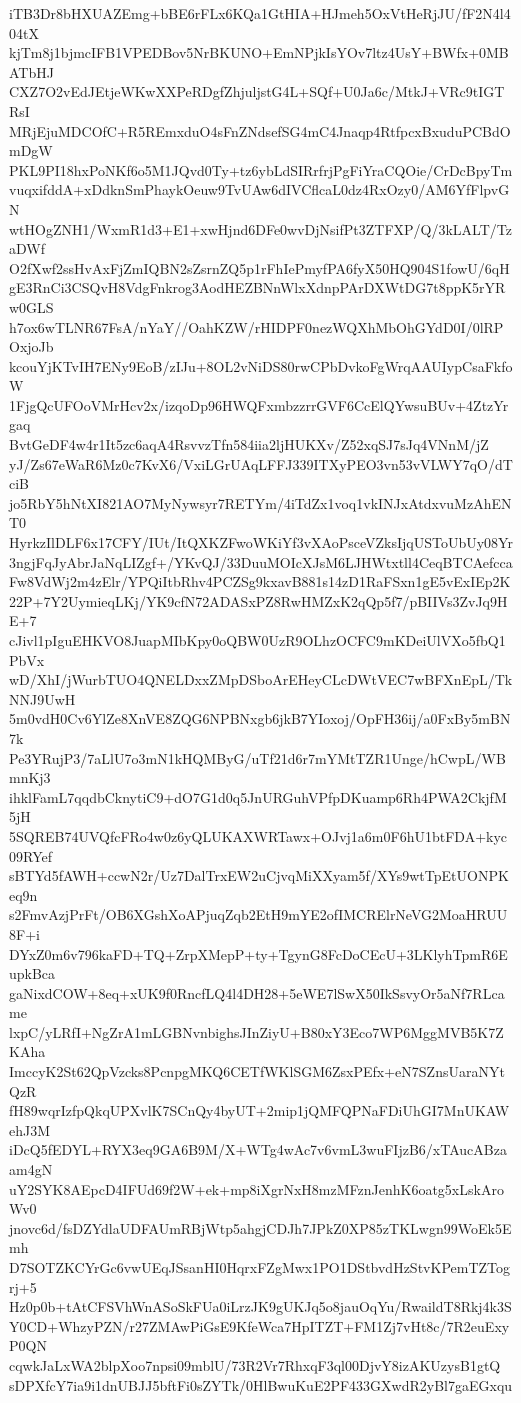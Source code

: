 iTB3Dr8bHXUAZEmg+bBE6rFLx6KQa1GtHIA+HJmeh5OxVtHeRjJU/fF2N4l404tX
kjTm8j1bjmcIFB1VPEDBov5NrBKUNO+EmNPjkIsYOv7ltz4UsY+BWfx+0MBATbHJ
CXZ7O2vEdJEtjeWKwXXPeRDgfZhjuljstG4L+SQf+U0Ja6c/MtkJ+VRc9tIGTRsI
MRjEjuMDCOfC+R5REmxduO4sFnZNdsefSG4mC4Jnaqp4RtfpcxBxuduPCBdOmDgW
PKL9PI18hxPoNKf6o5M1JQvd0Ty+tz6ybLdSIRrfrjPgFiYraCQOie/CrDcBpyTm
vuqxifddA+xDdknSmPhaykOeuw9TvUAw6dIVCflcaL0dz4RxOzy0/AM6YfFlpvGN
wtHOgZNH1/WxmR1d3+E1+xwHjnd6DFe0wvDjNsifPt3ZTFXP/Q/3kLALT/TzaDWf
O2fXwf2ssHvAxFjZmIQBN2sZsrnZQ5p1rFhIePmyfPA6fyX50HQ904S1fowU/6qH
gE3RnCi3CSQvH8VdgFnkrog3AodHEZBNnWlxXdnpPArDXWtDG7t8ppK5rYRw0GLS
h7ox6wTLNR67FsA/nYaY//OahKZW/rHIDPF0nezWQXhMbOhGYdD0I/0lRPOxjoJb
kcouYjKTvIH7ENy9EoB/zIJu+8OL2vNiDS80rwCPbDvkoFgWrqAAUIypCsaFkfoW
1FjgQcUFOoVMrHcv2x/izqoDp96HWQFxmbzzrrGVF6CcElQYwsuBUv+4ZtzYrgaq
BvtGeDF4w4r1It5zc6aqA4RsvvzTfn584iia2ljHUKXv/Z52xqSJ7sJq4VNnM/jZ
yJ/Zs67eWaR6Mz0c7KvX6/VxiLGrUAqLFFJ339ITXyPEO3vn53vVLWY7qO/dTciB
jo5RbY5hNtXI821AO7MyNywsyr7RETYm/4iTdZx1voq1vkINJxAtdxvuMzAhENT0
HyrkzIlDLF6x17CFY/IUt/ItQXKZFwoWKiYf3vXAoPsceVZksIjqUSToUbUy08Yr
3ngjFqJyAbrJaNqLIZgf+/YKvQJ/33DuuMOIcXJsM6LJHWtxtll4CeqBTCAefcca
Fw8VdWj2m4zElr/YPQiItbRhv4PCZSg9kxavB881s14zD1RaFSxn1gE5vExIEp2K
22P+7Y2UymieqLKj/YK9cfN72ADASxPZ8RwHMZxK2qQp5f7/pBIIVs3ZvJq9HE+7
cJivl1pIguEHKVO8JuapMIbKpy0oQBW0UzR9OLhzOCFC9mKDeiUlVXo5fbQ1PbVx
wD/XhI/jWurbTUO4QNELDxxZMpDSboArEHeyCLcDWtVEC7wBFXnEpL/TkNNJ9UwH
5m0vdH0Cv6YlZe8XnVE8ZQG6NPBNxgb6jkB7YIoxoj/OpFH36ij/a0FxBy5mBN7k
Pe3YRujP3/7aLlU7o3mN1kHQMByG/uTf21d6r7mYMtTZR1Unge/hCwpL/WBmnKj3
ihklFamL7qqdbCknytiC9+dO7G1d0q5JnURGuhVPfpDKuamp6Rh4PWA2CkjfM5jH
5SQREB74UVQfcFRo4w0z6yQLUKAXWRTawx+OJvj1a6m0F6hU1btFDA+kyc09RYef
sBTYd5fAWH+ccwN2r/Uz7DalTrxEW2uCjvqMiXXyam5f/XYs9wtTpEtUONPKeq9n
s2FmvAzjPrFt/OB6XGshXoAPjuqZqb2EtH9mYE2ofIMCRElrNeVG2MoaHRUU8F+i
DYxZ0m6v796kaFD+TQ+ZrpXMepP+ty+TgynG8FcDoCEcU+3LKlyhTpmR6EupkBca
gaNixdCOW+8eq+xUK9f0RncfLQ4l4DH28+5eWE7lSwX50IkSsvyOr5aNf7RLcame
lxpC/yLRfI+NgZrA1mLGBNvnbighsJInZiyU+B80xY3Eco7WP6MggMVB5K7ZKAha
ImccyK2St62QpVzcks8PcnpgMKQ6CETfWKlSGM6ZsxPEfx+eN7SZnsUaraNYtQzR
fH89wqrIzfpQkqUPXvlK7SCnQy4byUT+2mip1jQMFQPNaFDiUhGI7MnUKAWehJ3M
iDcQ5fEDYL+RYX3eq9GA6B9M/X+WTg4wAc7v6vmL3wuFIjzB6/xTAucABzaam4gN
uY2SYK8AEpcD4IFUd69f2W+ek+mp8iXgrNxH8mzMFznJenhK6oatg5xLskAroWv0
jnovc6d/fsDZYdlaUDFAUmRBjWtp5ahgjCDJh7JPkZ0XP85zTKLwgn99WoEk5Emh
D7SOTZKCYrGc6vwUEqJSsanHI0HqrxFZgMwx1PO1DStbvdHzStvKPemTZTogrj+5
Hz0p0b+tAtCFSVhWnASoSkFUa0iLrzJK9gUKJq5o8jauOqYu/RwaildT8Rkj4k3S
Y0CD+WhzyPZN/r27ZMAwPiGsE9KfeWca7HpITZT+FM1Zj7vHt8c/7R2euExyP0QN
cqwkJaLxWA2blpXoo7npsi09mblU/73R2Vr7RhxqF3ql00DjvY8izAKUzysB1gtQ
sDPXfcY7ia9i1dnUBJJ5bftFi0sZYTk/0HlBwuKuE2PF433GXwdR2yBl7gaEGxqu
